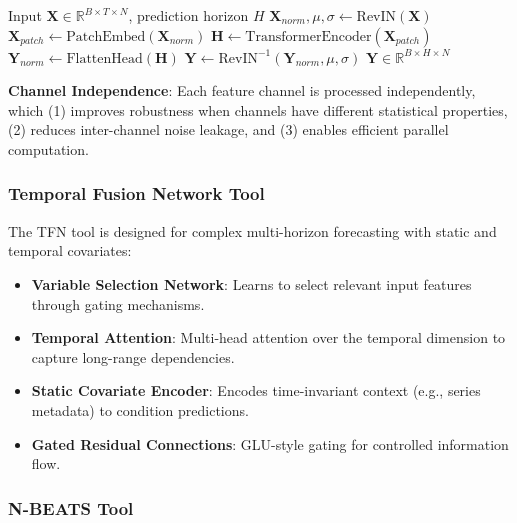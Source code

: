 \begin{algorithm}[H]
\caption{Patch-Transformer Forecasting}
\label{alg:patch_forecast}
\begin{algorithmic}[1]
\REQUIRE Input $\mathbf{X} \in \mathbb{R}^{B \times T \times N}$, prediction horizon $H$
\STATE $\mathbf{X}_{norm}, \mu, \sigma \leftarrow \text{RevIN}(\mathbf{X})$ 
\STATE $\mathbf{X}_{patch} \leftarrow \text{PatchEmbed}(\mathbf{X}_{norm})$ 
\STATE $\mathbf{H} \leftarrow \text{TransformerEncoder}(\mathbf{X}_{patch})$ 
\STATE $\mathbf{Y}_{norm} \leftarrow \text{FlattenHead}(\mathbf{H})$ 
\STATE $\mathbf{Y} \leftarrow \text{RevIN}^{-1}(\mathbf{Y}_{norm}, \mu, \sigma)$ 
\RETURN $\mathbf{Y} \in \mathbb{R}^{B \times H \times N}$
\end{algorithmic}
\end{algorithm}

\textbf{Channel Independence}: Each feature channel is processed independently, which (1) improves robustness when channels have different statistical properties, (2) reduces inter-channel noise leakage, and (3) enables efficient parallel computation.

\subsubsection{Temporal Fusion Network Tool}

The TFN tool is designed for complex multi-horizon forecasting with static and temporal covariates:

\begin{itemize}[leftmargin=*, itemsep=1pt]
    \item \textbf{Variable Selection Network}: Learns to select relevant input features through gating mechanisms.
    \item \textbf{Temporal Attention}: Multi-head attention over the temporal dimension to capture long-range dependencies.
    \item \textbf{Static Covariate Encoder}: Encodes time-invariant context (e.g., series metadata) to condition predictions.
    \item \textbf{Gated Residual Connections}: GLU-style gating for controlled information flow.
\end{itemize}

\subsubsection{N-BEATS Tool}

